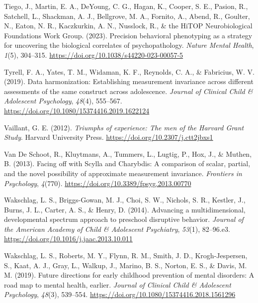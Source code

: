 \documentclass[
  american,
  letterpaper,
  12pt]{article}
\newlength{\cslhangindent}
\newenvironment{CSLReferences}[2] %
 {\begin{list}{}{%
  \setlength{\itemindent}{0pt}
  \setlength{\leftmargin}{0pt}
  \setlength{\parsep}{0pt}
  \ifodd #1
   \setlength{\leftmargin}{\cslhangindent}
   \setlength{\itemindent}{-1\cslhangindent}
  \fi
  \setlength{\itemsep}{#2\baselineskip}}}
 {\end{list}}
\begin{document}
\begin{CSLReferences}{1}{0}
{Tiego, J., Martin, E. A., DeYoung, C. G., Hagan, K., Cooper, S. E.,
Pasion, R., Satchell, L., Shackman, A. J., Bellgrove, M. A., Fornito,
A., Abend, R., Goulter, N., Eaton, N. R., Kaczkurkin, A. N., Nusslock,
R., \& the HiTOP Neurobiological Foundations Work Group}. (2023).
Precision behavioral phenotyping as a strategy for uncovering the
biological correlates of psychopathology. \emph{Nature Mental Health},
\emph{1}(5), 304--315. \url{https://doi.org/10.1038/s44220-023-00057-5}

Tyrell, F. A., Yates, T. M., Widaman, K. F., Reynolds, C. A., \&
Fabricius, W. V. (2019). Data harmonization: {Establishing} measurement
invariance across different assessments of the same construct across
adolescence. \emph{Journal of Clinical Child \& Adolescent Psychology},
\emph{48}(4), 555--567.
\url{https://doi.org/10.1080/15374416.2019.1622124}

Vaillant, G. E. (2012). \emph{Triumphs of experience: {The} men of the
{Harvard Grant Study}}. Harvard University Press.
\url{https://doi.org/10.2307/j.ctt2jbxs1}

Van De Schoot, R., Kluytmans, A., Tummers, L., Lugtig, P., Hox, J., \&
Muthen, B. (2013). Facing off with {Scylla} and {Charybdis}: {A}
comparison of scalar, partial, and the novel possibility of approximate
measurement invariance. \emph{Frontiers in Psychology}, \emph{4}(770).
\url{https://doi.org/10.3389/fpsyg.2013.00770}

Wakschlag, L. S., Briggs-Gowan, M. J., Choi, S. W., Nichols, S. R.,
Kestler, J., Burns, J. L., Carter, A. S., \& Henry, D. (2014). Advancing
a multidimensional, developmental spectrum approach to preschool
disruptive behavior. \emph{Journal of the American Academy of Child \&
Adolescent Psychiatry}, \emph{53}(1), 82--96.e3.
\url{https://doi.org/10.1016/j.jaac.2013.10.011}

Wakschlag, L. S., Roberts, M. Y., Flynn, R. M., Smith, J. D.,
Krogh-Jespersen, S., Kaat, A. J., Gray, L., Walkup, J., Marino, B. S.,
Norton, E. S., \& Davis, M. M. (2019). Future directions for early
childhood prevention of mental disorders: {A} road map to mental health,
earlier. \emph{Journal of Clinical Child \& Adolescent Psychology},
\emph{48}(3), 539--554.
\url{https://doi.org/10.1080/15374416.2018.1561296}


\end{CSLReferences}
\end{document}

